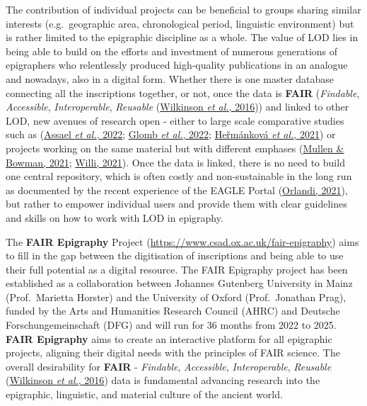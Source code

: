 \documentclass[
  12pt,
]{scrreprt}
\begin{document}
The contribution of individual projects can be beneficial to groups
sharing similar interests (e.g.~geographic area, chronological period,
linguistic environment) but is rather limited to the epigraphic
discipline as a whole. The value of LOD lies in being able to build on
the efforts and investment of numerous generations of epigraphers who
relentlessly produced high-quality publications in an analogue and
nowadays, also in a digital form. Whether there is one master database
connecting all the inscriptions together, or not, once the data is
\textbf{FAIR} (\emph{Findable}, \emph{Accessible}, \emph{Interoperable},
\emph{Reusable} (\protect\hyperlink{ref-wilkinson_fair_2016}{Wilkinson
\emph{et al.}, 2016})) and linked to other LOD, new avenues of research
open - either to large scale comparative studies such as
(\protect\hyperlink{ref-assael_restoring_2022}{Assael \emph{et al.},
2022}; \protect\hyperlink{ref-glomb_popularity_2022}{Glomb \emph{et
al.}, 2022};
\protect\hyperlink{ref-hermankova_inscriptions_2021}{Heřmánková \emph{et
al.}, 2021}) or projects working on the same material but with different
emphases (\protect\hyperlink{ref-mullen_manual_2021}{Mullen \& Bowman,
2021}; \protect\hyperlink{ref-willi_manual_2021}{Willi, 2021}). Once the
data is linked, there is no need to build one central repository, which
is often costly and non-sustainable in the long run as documented by the
recent experience of the EAGLE Portal
(\protect\hyperlink{ref-orlandi_digital_2021}{Orlandi, 2021}), but
rather to empower individual users and provide them with clear
guidelines and skills on how to work with LOD in epigraphy.

The \textbf{FAIR Epigraphy} Project
(\url{https://www.csad.ox.ac.uk/fair-epigraphy}) aims to fill in the gap
between the digitisation of inscriptions and being able to use their
full potential as a digital resource. The FAIR Epigraphy project has
been established as a collaboration between Johannes Gutenberg
University in Mainz (Prof.~Marietta Horster) and the University of
Oxford (Prof.~Jonathan Prag), funded by the Arts and Humanities Research
Council (AHRC) and Deutsche Forschungemeinschaft (DFG) and will run for
36 months from 2022 to 2025. \textbf{FAIR Epigraphy} aims to create an
interactive platform for all epigraphic projects, aligning their digital
needs with the principles of FAIR science. The overall desirability for
\textbf{FAIR} - \emph{Findable}, \emph{Accessible},
\emph{Interoperable}, \emph{Reusable}
(\protect\hyperlink{ref-wilkinson_fair_2016}{Wilkinson \emph{et al.},
2016}) data is fundamental advancing research into the epigraphic,
linguistic, and material culture of the ancient world.
\end{document}
